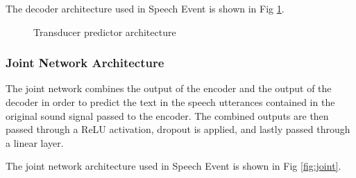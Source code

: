 \documentclass{CSSRforAfrica}
\begin{document}
The decoder architecture used in Speech Event is shown in Fig \ref{fig:transducer-decoder}.

\begin{figure}[thb]
\begin{center}
\end{center}
\caption{Transducer predictor architecture}
\label{fig:transducer-decoder}
\end{figure}

\subsubsection{Joint Network Architecture}
The joint network combines the output of the encoder and the output of the decoder in order to predict the text in the speech utterances contained in the original sound signal passed to the encoder. The combined outputs are then passed through a ReLU activation, dropout is applied, and lastly passed through a linear layer.

The joint network architecture used in Speech Event is shown in Fig \ref{fig:joint}.
\end{document}
